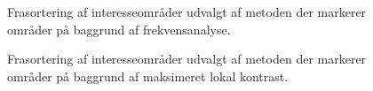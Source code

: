 \begin{figure}[htbp]
  \centering
  \begin{minipage}[b]{5 cm}
  \end{minipage}
  \begin{minipage}[b]{5 cm}
  \end{minipage}
  \caption{Frasortering af interesseområder udvalgt af metoden der markerer områder på baggrund af frekvensanalyse.}
   \label{fig:DetectPlateness-cleanup}
\end{figure}

\begin{figure}[htbp]
  \centering
  \begin{minipage}[b]{5 cm}
  \end{minipage}
  \begin{minipage}[b]{5 cm}
  \end{minipage}
  \caption{Frasortering af interesseområder udvalgt af metoden der markerer områder på baggrund af maksimeret lokal kontrast.}
   \label{fig:DetectCStretch-cleanup}
\end{figure}


